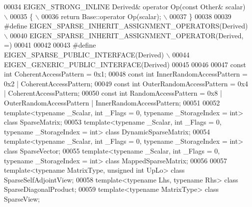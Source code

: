 \begin{DoxyCode}
00034 \textcolor{preprocessor}{EIGEN\_STRONG\_INLINE Derived& operator Op(const Other& scalar) \(\backslash\)}
00035 \textcolor{preprocessor}{\{ \(\backslash\)}
00036 \textcolor{preprocessor}{  return Base::operator Op(scalar); \(\backslash\)}
00037 \textcolor{preprocessor}{\}}
00038 
00039 \textcolor{preprocessor}{#define EIGEN\_SPARSE\_INHERIT\_ASSIGNMENT\_OPERATORS(Derived) \(\backslash\)}
00040 \textcolor{preprocessor}{EIGEN\_SPARSE\_INHERIT\_ASSIGNMENT\_OPERATOR(Derived, =)}
00041 
00042 
00043 \textcolor{preprocessor}{#define EIGEN\_SPARSE\_PUBLIC\_INTERFACE(Derived) \(\backslash\)}
00044 \textcolor{preprocessor}{  EIGEN\_GENERIC\_PUBLIC\_INTERFACE(Derived)}
00045 
00046   
00047 \textcolor{keyword}{const} \textcolor{keywordtype}{int} CoherentAccessPattern     = 0x1;
00048 \textcolor{keyword}{const} \textcolor{keywordtype}{int} InnerRandomAccessPattern  = 0x2 | CoherentAccessPattern;
00049 \textcolor{keyword}{const} \textcolor{keywordtype}{int} OuterRandomAccessPattern  = 0x4 | CoherentAccessPattern;
00050 \textcolor{keyword}{const} \textcolor{keywordtype}{int} RandomAccessPattern       = 0x8 | OuterRandomAccessPattern | InnerRandomAccessPattern;
00051 
00052 \textcolor{keyword}{template}<\textcolor{keyword}{typename} \_Scalar, \textcolor{keywordtype}{int} \_Flags = 0, \textcolor{keyword}{typename} \_StorageIndex = \textcolor{keywordtype}{int}>  \textcolor{keyword}{class }SparseMatrix;
00053 \textcolor{keyword}{template}<\textcolor{keyword}{typename} \_Scalar, \textcolor{keywordtype}{int} \_Flags = 0, \textcolor{keyword}{typename} \_StorageIndex = \textcolor{keywordtype}{int}>  \textcolor{keyword}{class }DynamicSparseMatrix;
00054 \textcolor{keyword}{template}<\textcolor{keyword}{typename} \_Scalar, \textcolor{keywordtype}{int} \_Flags = 0, \textcolor{keyword}{typename} \_StorageIndex = \textcolor{keywordtype}{int}>  \textcolor{keyword}{class }SparseVector;
00055 \textcolor{keyword}{template}<\textcolor{keyword}{typename} \_Scalar, \textcolor{keywordtype}{int} \_Flags = 0, \textcolor{keyword}{typename} \_StorageIndex = \textcolor{keywordtype}{int}>  \textcolor{keyword}{class }MappedSparseMatrix;
00056 
00057 \textcolor{keyword}{template}<\textcolor{keyword}{typename} MatrixType, \textcolor{keywordtype}{unsigned} \textcolor{keywordtype}{int} UpLo>  \textcolor{keyword}{class }SparseSelfAdjointView;
00058 \textcolor{keyword}{template}<\textcolor{keyword}{typename} Lhs, \textcolor{keyword}{typename} Rhs>              \textcolor{keyword}{class }SparseDiagonalProduct;
00059 \textcolor{keyword}{template}<\textcolor{keyword}{typename} MatrixType> \textcolor{keyword}{class }SparseView;

\end{DoxyCode}

